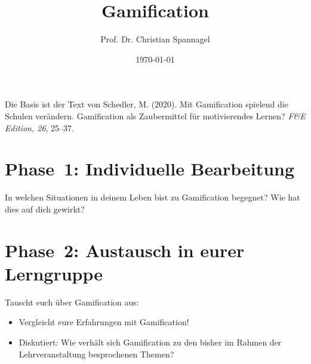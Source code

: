 \documentclass{cssheet}
\title{Gamification}
\author{Prof. Dr. Christian Spannagel}
\date{\today}
\begin{document}
\printtitle

Die Basis ist der Text von Schedler, M. (2020). Mit Gamification spielend die Schulen verändern. Gamification als Zaubermittel für motivierendes Lernen? \emph{F\&E Edition, 26}, 25--37.

\section*{Phase~1: Individuelle Bearbeitung}

\begin{aufgabe}
In welchen Situationen in deinem Leben bist zu Gamification begegnet? Wie hat dies auf dich gewirkt?
\end{aufgabe}


\section*{Phase~2: Austausch in eurer Lerngruppe}

\begin{aufgabe}
Tauscht euch über Gamification aus:
\begin{itemize}
\item Vergleicht eure Erfahrungen mit Gamification!
\item Diskutiert: Wie verhält sich Gamification zu den bisher im Rahmen der Lehrveranstaltung besprochenen Themen?
\end{itemize}
\end{aufgabe}

\vspace*{5cm}
\printlicense

\printsocials
\end{document}

